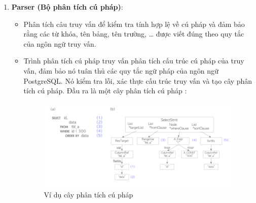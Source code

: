 \begin{enumerate}
    \item \textbf{Parser (Bộ phân tích cú pháp)}:
    \begin{itemize}
        \item Phân tích câu truy vấn để kiểm tra tính hợp lệ về cú pháp và đảm bảo rằng các từ khóa, tên bảng, tên trường, … được viết đúng theo quy tắc của ngôn ngữ truy vấn.
        \item Trình phân tích cú pháp truy vấn phân tích cấu trúc cú pháp của truy vấn, đảm bảo nó tuân thủ các quy tắc ngữ pháp của ngôn ngữ PostgreSQL. Nó kiểm tra lỗi, xác thực cấu trúc truy vấn và tạo cây phân tích cú pháp. Đầu ra là một cây phân tích cú pháp : 

      \begin{figure}[H]
                    \centering
                    \includegraphics[width = 1\textwidth]{Images/query-progress-01.png}
                    \caption{Ví dụ cây phân tích cú pháp}
                \end{figure}
                

\end{itemize}
\end{enumerate}
